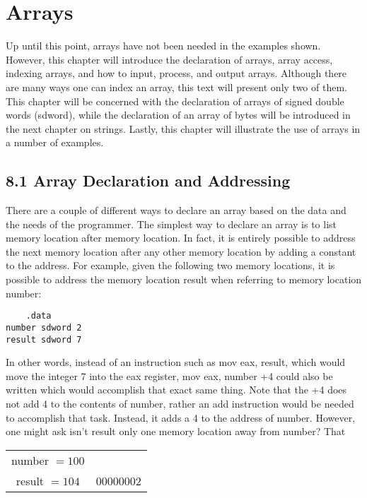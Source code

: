 \documentclass[10pt]{article}
\begin{document}
\section*{Arrays}
Up until this point, arrays have not been needed in the examples shown. However, this chapter will introduce the declaration of arrays, array access, indexing arrays, and how to input, process, and output arrays. Although there are many ways one can index an array, this text will present only two of them. This chapter will be concerned with the declaration of arrays of signed double words (sdword), while the declaration of an array of bytes will be introduced in the next chapter on strings. Lastly, this chapter will illustrate the use of arrays in a number of examples.

\subsection*{8.1 Array Declaration and Addressing}
There are a couple of different ways to declare an array based on the data and the needs of the programmer. The simplest way to declare an array is to list memory location after memory location. In fact, it is entirely possible to address the next memory location after any other memory location by adding a constant to the address. For example, given the following two memory locations, it is possible to address the memory location result when referring to memory location number:

\begin{verbatim}
    .data
number sdword 2
result sdword 7
\end{verbatim}

In other words, instead of an instruction such as mov eax, result, which would move the integer 7 into the eax register, mov eax, number +4 could also be written which would accomplish that exact same thing. Note that the +4 does not add 4 to the contents of number, rather an add instruction would be needed to accomplish that task. Instead, it adds a 4 to the address of number. However, one might ask isn't result only one memory location away from number? That

\begin{center}
\begin{tabular}{c|c|}
number $=100$ &  \\
result $=104$ & 00000002 \\
\hline
\end{tabular}
\end{center}
\end{document}
